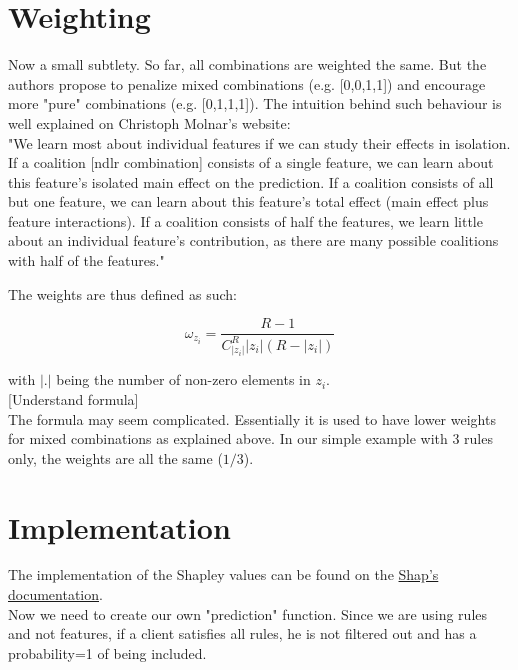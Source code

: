 \section{Weighting}

\label{sec:weighting}

Now a small subtlety. So far, all combinations are weighted the same. But the authors propose to penalize mixed combinations (e.g. [0,0,1,1]) and encourage more "pure" combinations (e.g. [0,1,1,1]). The intuition behind such behaviour is well explained on Christoph Molnar’s website: \\

"We learn most about individual features if we can study their effects in isolation. If a coalition [ndlr combination] consists of a single feature, we can learn about this feature’s isolated main effect on the prediction. If a coalition consists of all but one feature, we can learn about this feature’s total effect (main effect plus feature interactions). If a coalition consists of half the features, we learn little about an individual feature’s contribution, as there are many possible coalitions with half of the features."

The weights are thus defined as such:

$$\omega_{z_i} = \frac{R-1}{C_{|z_i|}^R |z_i|(R-|z_i|)}$$

with $|.|$ being the number of non-zero elements in $z_i$. \\

[Understand formula] \\

The formula may seem complicated. Essentially it is used to have lower weights for mixed combinations as explained above. In our simple example with 3 rules only, the weights are all the same ($1/3$).

\section{Implementation}

\label{sec:implementation}

The implementation of the Shapley values can be found on the \href{https://shap.readthedocs.io/en/latest/example_notebooks/tabular_examples/model_agnostic/Simple%20Kernel%20SHAP.html}{Shap's documentation}. \\

Now we need to create our own "prediction" function. Since we are using rules and not features, if a client satisfies all rules, he is not filtered out and has a probability=1 of being included. \\

